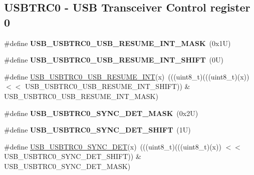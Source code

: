 \subsection*{U\+S\+B\+T\+R\+C0 -\/ U\+SB Transceiver Control register 0}
\begin{DoxyCompactItemize}
\item 
\mbox{\label{group___u_s_b___register___masks_ga9c943cc95fdf52fa40311292f2801518}} 
\#define {\bfseries U\+S\+B\+\_\+\+U\+S\+B\+T\+R\+C0\+\_\+\+U\+S\+B\+\_\+\+R\+E\+S\+U\+M\+E\+\_\+\+I\+N\+T\+\_\+\+M\+A\+SK}~(0x1\+U)
\item 
\mbox{\label{group___u_s_b___register___masks_ga48af1176ed5d811c299eb123f934425d}} 
\#define {\bfseries U\+S\+B\+\_\+\+U\+S\+B\+T\+R\+C0\+\_\+\+U\+S\+B\+\_\+\+R\+E\+S\+U\+M\+E\+\_\+\+I\+N\+T\+\_\+\+S\+H\+I\+FT}~(0\+U)
\item 
\#define \mbox{\hyperlink{group___u_s_b___register___masks_gaa9f049670f81705c2d16d233d26fcdef}{U\+S\+B\+\_\+\+U\+S\+B\+T\+R\+C0\+\_\+\+U\+S\+B\+\_\+\+R\+E\+S\+U\+M\+E\+\_\+\+I\+NT}}(x)~(((uint8\+\_\+t)(((uint8\+\_\+t)(x)) $<$$<$ U\+S\+B\+\_\+\+U\+S\+B\+T\+R\+C0\+\_\+\+U\+S\+B\+\_\+\+R\+E\+S\+U\+M\+E\+\_\+\+I\+N\+T\+\_\+\+S\+H\+I\+FT)) \& U\+S\+B\+\_\+\+U\+S\+B\+T\+R\+C0\+\_\+\+U\+S\+B\+\_\+\+R\+E\+S\+U\+M\+E\+\_\+\+I\+N\+T\+\_\+\+M\+A\+SK)
\item 
\mbox{\label{group___u_s_b___register___masks_ga2e2f3b4bb79885ed92d75c9f86d42e23}} 
\#define {\bfseries U\+S\+B\+\_\+\+U\+S\+B\+T\+R\+C0\+\_\+\+S\+Y\+N\+C\+\_\+\+D\+E\+T\+\_\+\+M\+A\+SK}~(0x2\+U)
\item 
\mbox{\label{group___u_s_b___register___masks_ga986ea3386acad15ab845a8c5d9644c9e}} 
\#define {\bfseries U\+S\+B\+\_\+\+U\+S\+B\+T\+R\+C0\+\_\+\+S\+Y\+N\+C\+\_\+\+D\+E\+T\+\_\+\+S\+H\+I\+FT}~(1\+U)
\item 
\#define \mbox{\hyperlink{group___u_s_b___register___masks_gaa41ec146d75f9df502036a725d938eb2}{U\+S\+B\+\_\+\+U\+S\+B\+T\+R\+C0\+\_\+\+S\+Y\+N\+C\+\_\+\+D\+ET}}(x)~(((uint8\+\_\+t)(((uint8\+\_\+t)(x)) $<$$<$ U\+S\+B\+\_\+\+U\+S\+B\+T\+R\+C0\+\_\+\+S\+Y\+N\+C\+\_\+\+D\+E\+T\+\_\+\+S\+H\+I\+FT)) \& U\+S\+B\+\_\+\+U\+S\+B\+T\+R\+C0\+\_\+\+S\+Y\+N\+C\+\_\+\+D\+E\+T\+\_\+\+M\+A\+SK)
\item 

\end{DoxyCompactItemize}
